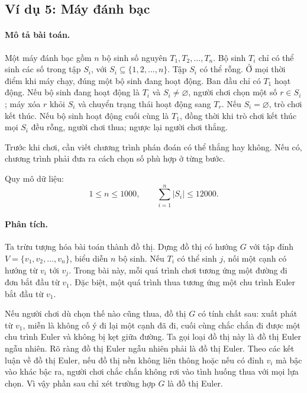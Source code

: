 \documentclass[11pt]{article}
\begin{document}
\subsection{Ví dụ 5: Máy đánh bạc}

\paragraph{Mô tả bài toán.}
Một máy đánh bạc gồm \(n\) bộ sinh số nguyên \(T_1,T_2,\ldots,T_n\). Bộ sinh
\(T_i\) chỉ có thể sinh các số trong tập \(S_i\), với \(S_i\subseteq
\{1,2,\ldots,n\}\). Tập \(S_i\) có thể rỗng. Ở mọi thời điểm khi máy chạy,
đúng một bộ sinh đang hoạt động. Ban đầu chỉ có \(T_1\) hoạt động. Nếu bộ sinh
đang hoạt động là \(T_i\) và \(S_i\ne\varnothing\), người chơi chọn một số
\(r\in S_i\); máy xóa \(r\) khỏi \(S_i\) và chuyển trạng thái hoạt động sang
\(T_r\). Nếu \(S_i=\varnothing\), trò chơi kết thúc. Nếu bộ sinh hoạt động
cuối cùng là \(T_1\), đồng thời khi trò chơi kết thúc mọi \(S_i\) đều rỗng,
người chơi thua; ngược lại người chơi thắng.

Trước khi chơi, cần viết chương trình phán đoán có thể thắng hay không. Nếu
có, chương trình phải đưa ra cách chọn số phù hợp ở từng bước.

Quy mô dữ liệu:
\[
  1\le n\le 1000,\qquad \sum_{i=1}^n |S_i|\le 12000.
\]

\paragraph{Phân tích.}
Ta trừu tượng hóa bài toán thành đồ thị. Dựng đồ thị có hướng \(G\) với tập
đỉnh \(V=\{v_1,v_2,\ldots,v_n\}\), biểu diễn \(n\) bộ sinh. Nếu \(T_i\) có thể
sinh \(j\), nối một cạnh có hướng từ \(v_i\) tới \(v_j\). Trong bài này, mỗi
quá trình chơi tương ứng một đường đi đơn bắt đầu từ \(v_1\). Đặc biệt, một
quá trình thua tương ứng một chu trình Euler bắt đầu từ \(v_1\).

Nếu người chơi dù chọn thế nào cũng thua, đồ thị \(G\) có tính chất sau: xuất
phát từ \(v_1\), miễn là không cố ý đi lại một cạnh đã đi, cuối cùng chắc chắn
đi được một chu trình Euler và không bị kẹt giữa đường. Ta gọi loại đồ thị này
là đồ thị Euler ngẫu nhiên. Rõ ràng đồ thị Euler ngẫu nhiên phải là đồ thị
Euler. Theo các kết luận về đồ thị Euler, nếu đồ thị nền không liên thông hoặc
nếu có đỉnh \(v_i\) mà bậc vào khác bậc ra, người chơi chắc chắn không rơi vào
tình huống thua với mọi lựa chọn. Vì vậy phần sau chỉ xét trường hợp \(G\) là
đồ thị Euler.
\end{document}
